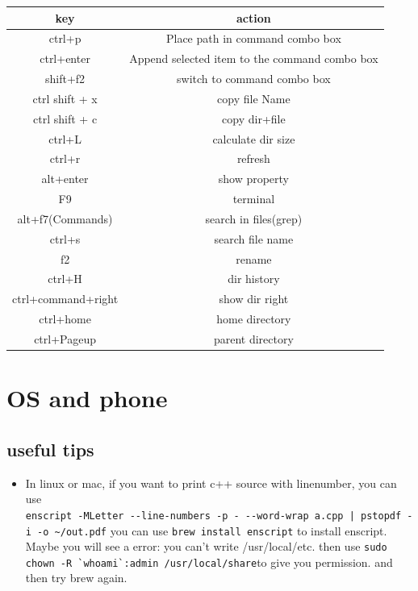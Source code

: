 \documentclass[a4paper,12pt,twoside]{book}
\begin{document}
\begin{tabular}{|c|c|}
\hline 
\textbf{key} & \textbf{action} \\ 
\hline 
ctrl+p & Place path in command combo box   \\ 
\hline 
ctrl+enter  & Append selected item to the command combo box \\ 
\hline 
shift+f2  & switch to command combo box \\ 

\hline 
ctrl shift + x & copy file Name \\ 
\hline 
ctrl shift + c & copy dir+file \\ 

\hline \hline  
ctrl+L & calculate dir size  \\ 
\hline 
ctrl+r & refresh  \\ 
\hline 
alt+enter & show property \\ 

\hline 
F9 & terminal  \\ 

\hline 
 alt+f7(Commands) & search in files(grep) \\ 
\hline 
ctrl+s  & search file name \\ 
\hline 
f2  & rename \\ 
\hline
ctrl+H  & dir history \\ 

\hline 
ctrl+command+right  & show dir right  \\ 
\hline 
ctrl+home  & home directory \\ 
\hline 
ctrl+Pageup  & parent directory  \\ 
\hline 
 
\end{tabular} 





\section{OS and phone}

\subsection{useful tips}
\begin{itemize}
\item In linux or mac, if you want to print c++ source with linenumber, you can use \\
\verb=enscript -MLetter --line-numbers -p - --word-wrap a.cpp | pstopdf -i -o ~/out.pdf=
you can use \verb=brew install enscript= to install enscript. Maybe you will see a error: you can't write /usr/local/etc.
then use \verb=sudo chown -R `whoami`:admin /usr/local/share=to give you permission. and then try brew again. 
\end{itemize}
\end{document}
